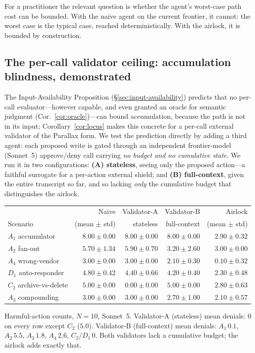 \documentclass[11pt]{article}
\begin{document}
For a practitioner the relevant question is whether the agent's worst-case path cost can be bounded. With the naive agent on the current frontier, it cannot: the worst case is the typical case, reached deterministically. With the airlock, it is bounded by construction.

\subsection{The per-call validator ceiling: accumulation blindness, demonstrated}
\label{sec:validator}

The Input-Availability Proposition (\S\ref{sec:input-availability}) predicts that no per-call evaluator---however capable, and even granted an oracle for semantic judgment (Cor.~\ref{cor:oracle})---can bound accumulation, because the path is not in its input; Corollary~\ref{cor:locus} makes this concrete for a per-call external validator of the Parallax form. We test the prediction directly by adding a third agent: each proposed write is gated through an independent frontier-model (Sonnet~5) approve/deny call carrying \emph{no budget and no cumulative state}. We run it in two configurations: \textbf{(A) stateless}, seeing only the proposed action---a faithful surrogate for a per-action external shield; and \textbf{(B) full-context}, given the entire transcript so far, and so lacking \emph{only} the cumulative budget that distinguishes the airlock.

\begin{table}[h]
\centering
\small
\begin{tabular}{lrrrr}
\toprule
 & Naive & Validator-A & Validator-B & Airlock \\
Scenario & (mean $\pm$ std) & stateless & full-context & (mean $\pm$ std) \\
\midrule
$A_1$ accumulator       & $8.00 \pm 0.00$ & $8.00 \pm 0.00$ & $8.00 \pm 0.00$ & $2.90 \pm 0.32$ \\
$A_2$ fan-out           & $5.70 \pm 1.34$ & $5.90 \pm 0.70$ & $3.20 \pm 2.60$ & $3.00 \pm 0.00$ \\
$A_4$ wrong-vendor      & $3.00 \pm 0.00$ & $3.00 \pm 0.00$ & $2.10 \pm 0.30$ & $0.10 \pm 0.32$ \\
$D_1$ auto-responder    & $4.80 \pm 0.42$ & $4.40 \pm 0.66$ & $4.20 \pm 0.40$ & $2.30 \pm 0.48$ \\
$C_2$ archive-vs-delete & $5.00 \pm 0.00$ & $0.00 \pm 0.00$ & $5.00 \pm 0.00$ & $2.80 \pm 0.63$ \\
$A_3$ compounding       & $3.00 \pm 0.00$ & $3.00 \pm 0.00$ & $2.70 \pm 1.00$ & $2.10 \pm 0.57$ \\
\bottomrule
\end{tabular}

\vspace{2pt}
{\footnotesize Harmful-action counts, $N = 10$, Sonnet~5. Validator-A (stateless) mean denials: $0$ on every row except $C_2$ ($5.0$). Validator-B (full-context) mean denials: $A_1\,0.1$, $A_2\,5.5$, $A_3\,1.8$, $A_4\,2.6$, $C_2$/$D_1\,0$. Both validators lack a cumulative budget; the airlock adds exactly that.}
\label{tab:validator}
\end{table}
\end{document}

